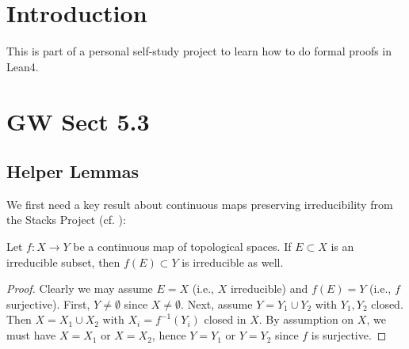 %

\section{Introduction}

This is part of a personal self-study project to learn how to do formal proofs in Lean4.

\section{GW Sect 5.3}

\subsection{Helper Lemmas}

We first need a key result about continuous maps preserving irreducibility from the Stacks Project (cf. \cite[\href{https://stacks.math.columbia.edu/tag/0379}{Lemma 0379}]{stacks-project}):

\begin{lemma}
\label{stacks_irreducible_preservation}
Let $f : X \to Y$ be a continuous map of topological spaces. If $E \subset X$ is an irreducible subset, then $f(E) \subset Y$ is irreducible as well.
\end{lemma}

\begin{proof}
Clearly we may assume $E = X$ (i.e., $X$ irreducible) and $f(E) = Y$ (i.e., $f$ surjective). First, $Y \neq \emptyset$ since $X \neq \emptyset$. Next, assume $Y = Y_1 \cup Y_2$ with $Y_1, Y_2$ closed. Then $X = X_1 \cup X_2$ with $X_i = f^{-1}(Y_i)$ closed in $X$. By assumption on $X$, we must have $X = X_1$ or $X = X_2$, hence $Y = Y_1$ or $Y = Y_2$ since $f$ is surjective.
\end{proof}

